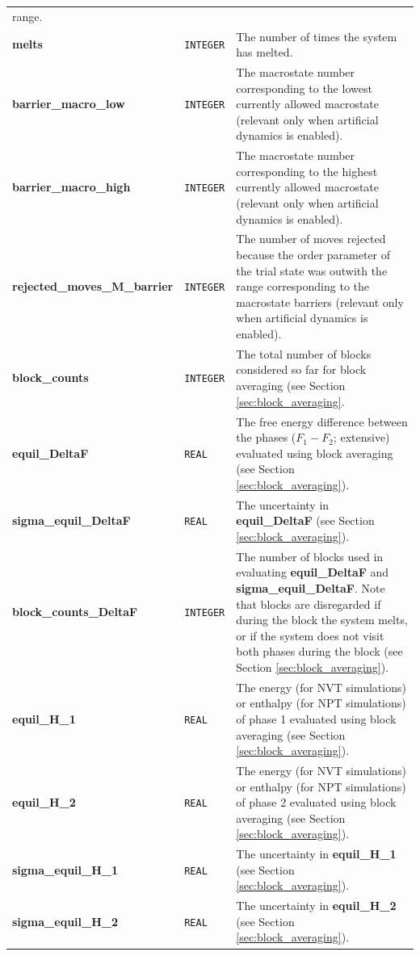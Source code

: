 \documentclass{report}
\begin{document}
\begin{landscape}
\begin{center}
\begin{longtable}{ l l p{8cm}}
range.\\
\textbf{melts} & \texttt{INTEGER} & The number of times the system has melted. \\
\textbf{barrier\_macro\_low} & \texttt{INTEGER} & The macrostate number corresponding to the lowest currently allowed macrostate (relevant only when artificial
dynamics is enabled). \\
\textbf{barrier\_macro\_high} & \texttt{INTEGER} & The macrostate number corresponding to the highest currently allowed macrostate (relevant only when artificial
dynamics is enabled). \\
\textbf{rejected\_moves\_M\_barrier} & \texttt{INTEGER} & The number of moves rejected because the order parameter of the trial state was outwith the range
corresponding to the macrostate barriers (relevant only when artificial dynamics is enabled).\\
\textbf{block\_counts} & \texttt{INTEGER} & The total number of blocks considered so far for block averaging (see Section \ref{sec:block_averaging}.  \\
\textbf{equil\_DeltaF} & \texttt{REAL} & The free energy difference between the phases ($F_1-F_2$; extensive) evaluated using block averaging (see Section \ref{sec:block_averaging}).\\
\textbf{sigma\_equil\_DeltaF} & \texttt{REAL} & The uncertainty in \textbf{equil\_DeltaF} (see Section \ref{sec:block_averaging}).\\
\textbf{block\_counts\_DeltaF} & \texttt{INTEGER} & The number of blocks used in evaluating \textbf{equil\_DeltaF} and \textbf{sigma\_equil\_DeltaF}. Note that
blocks are disregarded if during the block the system melts, or if the system does not visit both phases during the block  (see Section \ref{sec:block_averaging}). \\
\textbf{equil\_H\_1} & \texttt{REAL} & The energy (for NVT simulations) or enthalpy (for NPT simulations) of phase 1 evaluated using block averaging (see Section \ref{sec:block_averaging}).\\
\textbf{equil\_H\_2} & \texttt{REAL} & The energy (for NVT simulations) or enthalpy (for NPT simulations) of phase 2 evaluated using block averaging (see Section \ref{sec:block_averaging}).\\
\textbf{sigma\_equil\_H\_1} & \texttt{REAL} & The uncertainty in \textbf{equil\_H\_1} (see Section \ref{sec:block_averaging}).\\
\textbf{sigma\_equil\_H\_2} & \texttt{REAL} & The uncertainty in \textbf{equil\_H\_2} (see Section \ref{sec:block_averaging}).\\

\end{longtable}
\end{center}
\end{landscape}
\end{document}

